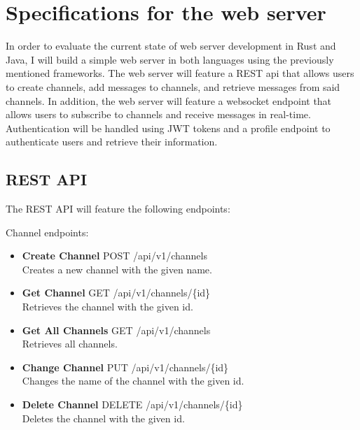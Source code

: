 \documentclass[a4paper,12pt]{article}
\begin{document}
	\newpage
	\section{Specifications for the web server}
	\label{sec:example_project}
	In order to evaluate the current state of web server development in Rust and Java, I will build a simple web server in 
	both languages using the previously mentioned frameworks. The web server will feature a REST api that allows users to 
	create channels, add messages to channels, and retrieve messages from said channels. In addition, the web server will 
	feature a websocket endpoint that allows users to subscribe to channels and receive messages in real-time. Authentication 
	will be handled using JWT tokens and a profile endpoint to authenticate users and retrieve their information.

	\subsection{REST API}
	\label{subsec:rest_api}
	The REST API will feature the following endpoints:

	Channel endpoints:
	\begin{itemize}
		\item \textbf{Create Channel} \- POST /api/v1/channels \\
		Creates a new channel with the given name.
		\item \textbf{Get Channel} \- GET /api/v1/channels/\{id\} \\
		Retrieves the channel with the given id.
		\item \textbf{Get All Channels} \- GET /api/v1/channels \\
		Retrieves all channels.
		\item \textbf{Change Channel} \- PUT /api/v1/channels/\{id\} \\
		Changes the name of the channel with the given id.
		\item \textbf{Delete Channel} \- DELETE /api/v1/channels/\{id\} \\
		Deletes the channel with the given id.
	\end{itemize}
\end{document}
